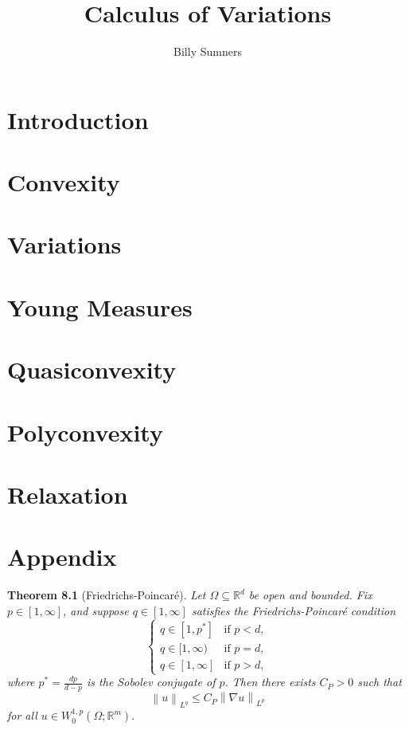 \documentclass{book}
\title{Calculus of Variations}
\author{Billy Sumners}
\newcommand{\bbR}{\mathbb{R}}
\newcommand{\norm}[1]{\left\lVert {#1} \right\rVert}
\newtheorem{theorem}{Theorem}[chapter]
\theoremstyle{definition}
\numberwithin{equation}{chapter}
\begin{document}
\maketitle 

\tableofcontents

\chapter{Introduction}

\chapter{Convexity}


\chapter{Variations}


\chapter{Young Measures}


\chapter{Quasiconvexity}


\chapter{Polyconvexity}


\chapter{Relaxation}


\appendix
\chapter{Appendix}

\begin{theorem}[Friedrichs-Poincar\'e]
    Let $\Omega \subseteq \bbR^d$ be open and bounded. Fix $p \in [1,\infty]$, and suppose $q \in [1,\infty]$ satisfies the \textit{Friedrichs-Poincar\'e condition}
    \begin{equation}
        \begin{cases}
            q \in [1,p^*]    & \text{if } p < d, \\
            q \in [1,\infty) & \text{if } p = d, \\
            q \in [1,\infty] & \text{if } p > d,
        \end{cases}
    \end{equation}
    where $p^* = \frac{dp}{d - p}$ is the \textit{Sobolev conjugate} of $p$. Then there exists $C_P > 0$ such that
    \begin{equation}
        \norm{u}_{L^q} \leq C_P \norm{\nabla u}_{L^p}
    \end{equation}
    for all $u \in W_0^{1,p}(\Omega;\bbR^m)$.
\end{theorem}
\end{document}
